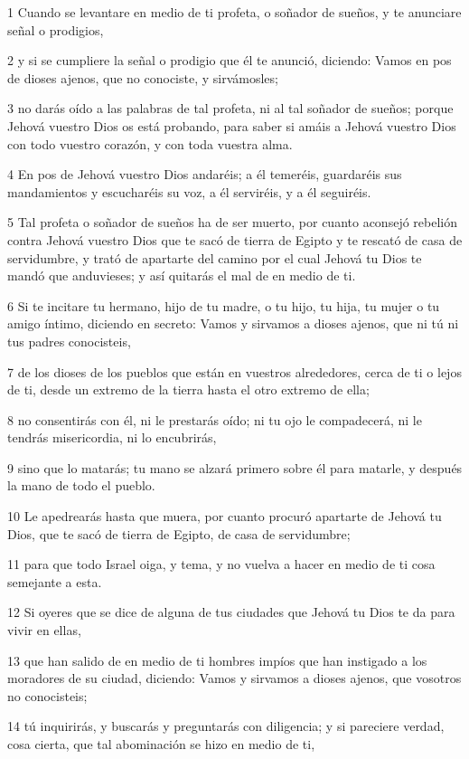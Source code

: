 \par 1 Cuando se levantare en medio de ti profeta, o soñador de sueños, y te anunciare señal o prodigios,
\par 2 y si se cumpliere la señal o prodigio que él te anunció, diciendo: Vamos en pos de dioses ajenos, que no conociste, y sirvámosles;
\par 3 no darás oído a las palabras de tal profeta, ni al tal soñador de sueños; porque Jehová vuestro Dios os está probando, para saber si amáis a Jehová vuestro Dios con todo vuestro corazón, y con toda vuestra alma.
\par 4 En pos de Jehová vuestro Dios andaréis; a él temeréis, guardaréis sus mandamientos y escucharéis su voz, a él serviréis, y a él seguiréis.
\par 5 Tal profeta o soñador de sueños ha de ser muerto, por cuanto aconsejó rebelión contra Jehová vuestro Dios que te sacó de tierra de Egipto y te rescató de casa de servidumbre, y trató de apartarte del camino por el cual Jehová tu Dios te mandó que anduvieses; y así quitarás el mal de en medio de ti.
\par 6 Si te incitare tu hermano, hijo de tu madre, o tu hijo, tu hija, tu mujer o tu amigo íntimo, diciendo en secreto: Vamos y sirvamos a dioses ajenos, que ni tú ni tus padres conocisteis,
\par 7 de los dioses de los pueblos que están en vuestros alrededores, cerca de ti o lejos de ti, desde un extremo de la tierra hasta el otro extremo de ella;
\par 8 no consentirás con él, ni le prestarás oído; ni tu ojo le compadecerá, ni le tendrás misericordia, ni lo encubrirás,
\par 9 sino que lo matarás; tu mano se alzará primero sobre él para matarle, y después la mano de todo el pueblo.
\par 10 Le apedrearás hasta que muera, por cuanto procuró apartarte de Jehová tu Dios, que te sacó de tierra de Egipto, de casa de servidumbre;
\par 11 para que todo Israel oiga, y tema, y no vuelva a hacer en medio de ti cosa semejante a esta.
\par 12 Si oyeres que se dice de alguna de tus ciudades que Jehová tu Dios te da para vivir en ellas,
\par 13 que han salido de en medio de ti hombres impíos que han instigado a los moradores de su ciudad, diciendo: Vamos y sirvamos a dioses ajenos, que vosotros no conocisteis;
\par 14 tú inquirirás, y buscarás y preguntarás con diligencia; y si pareciere verdad, cosa cierta, que tal abominación se hizo en medio de ti,
